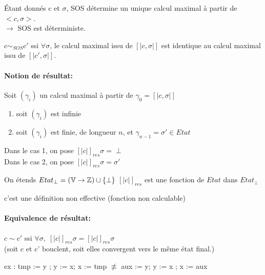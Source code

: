 \documentclass[10pt,a4paper]{article}
\newcommand{\sem}[1]{$\left[| #1 | \right]$}
\newcommand{\semm}[1]{\left[| #1 | \right]}
\newcommand{\Vs}{\mathbb{V}}
\begin{document}
\begin{thm}Étant donnés c et $\sigma$, SOS détermine un unique calcul maximal à partir de $<c, \sigma >$.\\
 $\rightarrow$ SOS est déterministe.\\
 \end{thm}
 
 \begin{definition}[Equivalence]
 $ c \sim_{SOS} c'$ ssi $\forall \sigma$, le calcul maximal issu de \sem{c , \sigma} est  identique au calcul maximal issu de \sem{c', \sigma}.
 \end{definition}
 


\paragraph*{Notion de résultat:}
\begin{thm} Soit $(\gamma_i)$ un calcul maximal à partir de $\gamma_0 = \semm{c, \sigma }$
\begin{enumerate}
\item soit $(\gamma_i)$ est infinie
\item soit $(\gamma_i )$ est finie, de longueur $n$, et $\gamma_{n-1} = \sigma' \in Etat$
\end{enumerate}
Dans le cas 1, on pose $\semm{ c }_{res} \sigma = \perp$\\
Dans le cas 2, on pose $\semm{ c }_{res} \sigma  = \sigma'$\\
\end{thm}


On étends $Etat_{\perp} = (\Vs \rightarrow \Zs) \cup \{ \perp \}$
$\semm{ c }_{res}$ est une fonction de $Etat$ dans $Etat_{\perp}$
\begin{rem} c'est une définition non effective (fonction non calculable)
\end{rem}


\paragraph{Equivalence de résultat:}
\begin{definition} $c \sim c'$ ssi $\forall \sigma, \; \semm{ c }_{res} \sigma = \semm{ c }_{res} \sigma$\\
(soit c et c' bouclent, soit elles convergent vers le même état final.)
\end{definition}

ex : tmp := y ; y := x; x := tmp $\not \equiv$ aux := y; y := x ; x := aux
\end{document}
